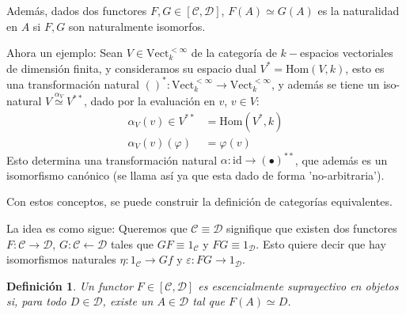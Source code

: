 \documentclass[12pt,letterpaper,titlepage]{article}
\newtheorem*{defn}{Definición}
\theoremstyle{definition}
\renewcommand\phi{\varphi}
\newcommand{\Hom}{\mathrm{Hom}}
\newcommand\<{\langle}
\renewcommand\>{\rangle}
\newcommand{\Vect}{\mathrm{Vect}}
\newcommand{\id}{\mathrm{id}}
\begin{document}
Además, dados dos functores $F,G\in[\mathcal{C,D}]$, $F(A)\simeq G(A)$ es la naturalidad en $A$ si $F,G$ son naturalmente isomorfos.

Ahora un ejemplo:
Sean $V\in\Vect_k^{<\infty}$ de la categoría de $k-$espacios vectoriales de dimensión finita, y consideramos su espacio dual $V^*=\Hom(V,k)$, esto es una transformación natural $()^*:\Vect_k^{<\infty}\to\Vect_k^{<\infty}$, y además se tiene un iso-natural $V\overset{\alpha_V}{\simeq} V^{**}$, dado por la evaluación en $v$, $v\in V$:
    \begin{align*}
        \alpha_V(v)\in V^{**} & = \Hom(V^*,k) \\
        \alpha_V(v)(\phi) & = \phi(v)
    \end{align*}
Esto determina una transformación natural $\alpha:\id\to(\bullet)^{**}$, que además es un isomorfismo canónico (se llama así ya que esta dado de forma 'no-arbitraria').

Con estos conceptos, se puede construir la definición de categorías equivalentes.

La idea es como sigue: Queremos que $\mathcal{C\equiv D}$ signifique que existen dos functores $F:\mathcal{C\to D}$, $G:\mathcal{C\leftarrow D}$ tales que $GF\equiv 1_\mathcal{C}$ y $FG\equiv 1_\mathcal{D}$. Esto quiere decir que hay isomorfismos naturales $\eta:1_\mathcal{C}\to Gf$ y $\varepsilon: FG\to1_\mathcal{D}$.

\begin{defn}
    Un functor $F\in [\mathcal{C,D}]$ es escencialmente suprayectivo en objetos si, para todo $D\in\mathcal{D}$, existe un $A\in\mathcal{D}$ tal que $F(A)\simeq D$.
\end{defn}
\end{document}
